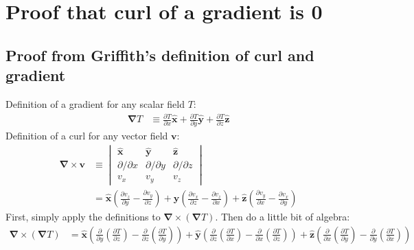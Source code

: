 \documentclass[a4paper]{article}
\theoremstyle{plain}
\theoremstyle{definition}
\newcommand{\vect}[1]{\textbf{#1}}
\newcommand{\hatvec}[1]{\hat{\textbf{#1}}}
\newcommand{\del}{\bm{\nabla}}
\begin{document}


\appendix

\section{Proof that curl of a gradient is 0}
\label{sec:curlofgradis0}

\subsection{Proof from Griffith's definition of curl and gradient}
\label{sec:curofgradis0proof1}

Definition of a gradient for any scalar field $T$:
\begin{align*}
  \del T & \equiv \frac{\partial T}{\partial x} \hatvec{x}
                + \frac{\partial T}{\partial y} \hatvec{y}
                + \frac{\partial T}{\partial z} \hatvec{z}
\end{align*}
Definition of a curl for any vector field $\vect{v}$:
\begin{align*}
  \del \times \vect{v} &
      \equiv \begin{vmatrix}
                 \hatvec{x} & \hatvec{y} & \hatvec{z} \\
                 \partial / \partial x & \partial / \partial y & \partial / \partial z \\
                 v_x & v_y & v_z
             \end{vmatrix} \\
      & =   \hatvec{x} ( \frac{\partial v_z}{\partial y} - \frac{\partial v_y}{\partial z} )
          + \hatvec{y} ( \frac{\partial v_x}{\partial z} - \frac{\partial v_z}{\partial x} )
          + \hatvec{z} ( \frac{\partial v_y}{\partial x} - \frac{\partial v_x}{\partial y} )
\end{align*}
First, simply apply the definitions to $\del \times (\del T)$.  Then
do a little bit of algebra:
\begin{align}
\del \times (\del T) &
  = \hatvec{x} ( \frac{\partial}{\partial y} ( \frac{\partial T}{\partial z} ) - \frac{\partial}{\partial z} ( \frac{\partial T}{\partial y} ) )
  + \hatvec{y} ( \frac{\partial}{\partial z} ( \frac{\partial T}{\partial x} ) - \frac{\partial}{\partial x} ( \frac{\partial T}{\partial z} ) )
  + \hatvec{z} ( \frac{\partial}{\partial x} ( \frac{\partial T}{\partial y} ) - \frac{\partial}{\partial y} ( \frac{\partial T}{\partial x} ) )
  \label{eqn:curlofgrad1}
\end{align}
\end{document}
